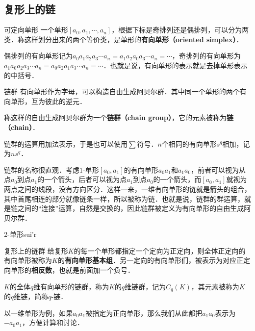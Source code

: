 



\subsection{复形上的链}

\begin{definition}{可定向单形}
一个单形$[a_0, a_1, \cdots, a_n]$，根据下标是奇排列还是偶排列，可以分为两类．称这样划分出来的两个等价类，是单形的\textbf{有向单形（oriented simplex）}．

偶排列的有向单形记为$a_0a_1a_2a_3\cdots a_n=a_1a_2a_0a_3\cdots a_n=\cdots$，奇排列的有向单形为$a_1a_0a_2a_3\cdots a_n=a_0a_2a_1a_3\cdots a_n=\cdots$．也就是说，有向单形的表示就是去掉单形表示的中括号．
\end{definition}

\begin{definition}{链群}
有向单形作为字母，可以构造自由生成阿贝尔群．其中同一个单形的两个有向单形，互为彼此的逆元．

称这样的自由生成阿贝尔群为一个\textbf{链群（chain group）}，它的元素被称为\textbf{链（chain）}．

链群的运算用加法表示，于是也可以使用$\sum$符号．$n$个相同的有向单形$s^q$相加，记为$ns^q$．
\end{definition}

链群的名称很直观．考虑$1$-单形$[a_0, a_1]$的有向单形$a_0a_1$和$a_1a_0$，前者可以视为从点$a_0$到点$a_1$的一个箭头，后者可以视为点$a_1$到点$a_0$的一个箭头，而$[a_0, a_1]$就视为两点之间的线段，没有方向区分．这样一来，一维有向单形的链就是箭头的组合，其中首尾相连的部分就像链条一样，所以被称为链．也就是说，链群的群运算，就是链之间的“连接”运算，自然是交换的，因此链群被定义为有向单形的自由生成阿贝尔群．

$2$-单形sui'r

\begin{definition}{复形上的链群}
给复形$K$的每一个单形都指定一个定向为正定向，则全体正定向的有向单形被称为$K$的\textbf{有向单形基本组}．另一定向的有向单形们，被表示为对应正定向单形的\textbf{相反数}，也就是前面加一个负号．

$K$的全体$q$维有向单形的链群，称为$K$的$q$维链群，记为$C_q(K)$，其元素被称为$K$的$q$维链，简称$q$-链．
\end{definition}

以一维单形为例，如果$a_0a_1$被指定为正向单形，那么我们从此都把$a_1a_0$表示为$-a_0a_1$，方便计算和讨论．

